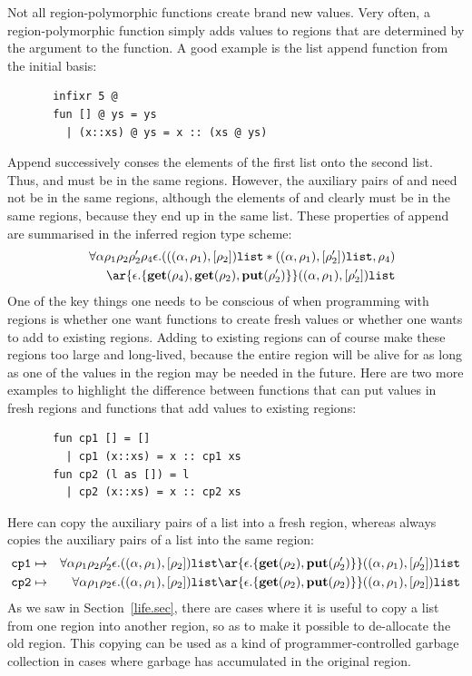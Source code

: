 \documentclass[12pt]{book}
\begin{document}
Not all region-polymorphic functions create brand new values. Very often, a
region-polymorphic function simply adds values to regions that are determined
by the argument to the function. A good example is the list append function
from the initial basis:
\begin{verbatim}
       infixr 5 @
       fun [] @ ys = ys
         | (x::xs) @ ys = x :: (xs @ ys)
\end{verbatim}
Append successively conses the elements of the first list onto the second list.
Thus,  and  must be in the same regions. However, the auxiliary pairs of
  and  need not be in the same regions, although
the elements of  and  clearly must be in the same regions,
because they end up in the same list. These properties of append are summarised
in the inferred region type scheme:
\begin{eqnarray*}
&&\forall\alpha\rho_1\rho_2\rho_2'\rho_4\epsilon.
   ( ((\alpha,\rho_1),[\rho_2])\boxml{list} \ast
      ((\alpha,\rho_1),[\rho_2'])\boxml{list}, \rho_4) \\ 
&&\ar{\epsilon.\{\Get(\rho_4),\Get(\rho_2),\Put(\rho_2')\}} ((\alpha,\rho_1),[\rho_2'])\boxml{list}
\end{eqnarray*}
One of the key things one needs to be conscious of when programming
with regions is whether one want functions to create fresh values or
whether one wants to add to existing regions. Adding to existing
regions can of course make these regions too large and long-lived,
because the entire region will be alive for as long as one of the values
in the region may be needed in the future. Here are two more examples
to highlight the difference between functions that can put values in
fresh regions and functions that add values to existing regions:
\begin{verbatim}
       fun cp1 [] = []   
         | cp1 (x::xs) = x :: cp1 xs
       fun cp2 (l as []) = l
         | cp2 (x::xs) = x :: cp2 xs
\end{verbatim}
Here  can copy the auxiliary pairs of a list into a fresh region, whereas  always
copies the auxiliary pairs of a list into the same region:
\begin{eqnarray*}
\boxml{cp1}&\mapsto&\forall\alpha\rho_1\rho_2\rho_2'\epsilon.
     ((\alpha,\rho_1),[\rho_2])\boxml{list} \ar{\epsilon.\{\Get(\rho_2),
           \Put(\rho_2')\}} ((\alpha,\rho_1),[\rho_2'])\boxml{list}\\
\boxml{cp2}&\mapsto&\forall\alpha\rho_1\rho_2\epsilon.
     ((\alpha,\rho_1),[\rho_2])\boxml{list} \ar{\epsilon.\{\Get(\rho_2),
           \Put(\rho_2)\}} ((\alpha,\rho_1),[\rho_2])\boxml{list}
\end{eqnarray*}
As we saw in Section~\ref{life.sec}, there are cases where it is useful to copy a list from one region into another region,
so as to make it possible to de-allocate the old region. This copying can be used
as a kind of programmer-controlled garbage collection in cases where garbage has accumulated
in the original region. 
\end{document}
